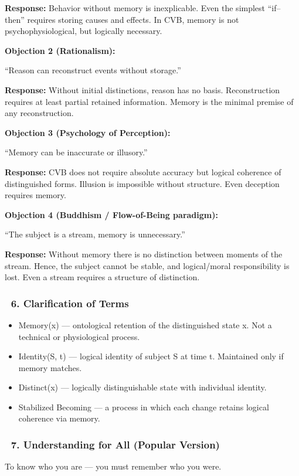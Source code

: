 \documentclass[12pt]{article}
\begin{document}
\textbf{Response:}
Behavior without memory is inexplicable. Even the simplest ``if–then'' requires storing causes and effects. In CVB, memory is not psychophysiological, but logically necessary.

\bigskip
\textbf{Objection 2 (Rationalism):}

``Reason can reconstruct events without storage.''

\textbf{Response:}
Without initial distinctions, reason has no basis. Reconstruction requires at least partial retained information. Memory is the minimal premise of any reconstruction.

\bigskip
\textbf{Objection 3 (Psychology of Perception):}

``Memory can be inaccurate or illusory.''

\textbf{Response:}
CVB does not require absolute accuracy but logical coherence of distinguished forms. Illusion is impossible without structure. Even deception requires memory.

\bigskip
\textbf{Objection 4 (Buddhism / Flow-of-Being paradigm):}

``The subject is a stream, memory is unnecessary.''

\textbf{Response:}
Without memory there is no distinction between moments of the stream. Hence, the subject cannot be stable, and logical/moral responsibility is lost. Even a stream requires a structure of distinction.

\subsubsection*{🔹 6. Clarification of Terms}
\begin{itemize}
\item Memory(x) — ontological retention of the distinguished state x. Not a technical or physiological process.
\item Identity(S, t) — logical identity of subject S at time t. Maintained only if memory matches.
\item Distinct(x) — logically distinguishable state with individual identity.
\item Stabilized Becoming — a process in which each change retains logical coherence via memory.
\end{itemize}

\subsubsection*{🔹 7. Understanding for All (Popular Version)}
To know who you are — you must remember who you were.
\end{document}
